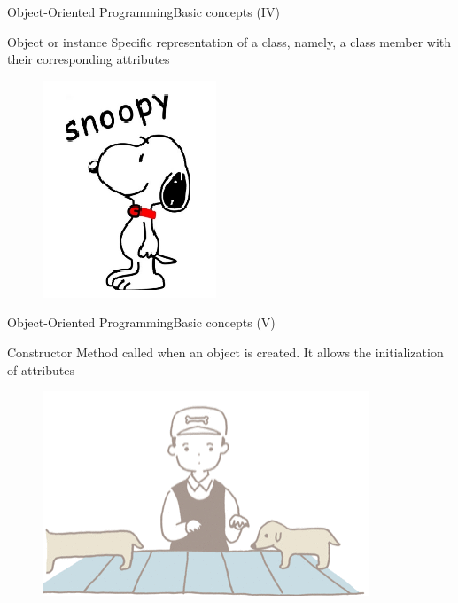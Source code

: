 \documentclass[10pt,compress]{beamer} %
\begin{document}
\begin{frame}{Object-Oriented Programming}{Basic concepts (IV)}
	\vfill\begin{block}{Object or instance}
		 Specific representation of a class, namely, a class member with their corresponding attributes
  	\end{block}	  	
		\begin{figure}
			\includegraphics[scale=0.5]{figs/instancia}
		\end{figure}				
\end{frame}

\begin{frame}{Object-Oriented Programming}{Basic concepts (V)}
	\begin{block}{Constructor}
		 Method called when an object is created. It allows the initialization of attributes
  	\end{block}	
		\begin{figure}
			\includegraphics[scale=0.5]{figs/constructor}
		\end{figure}				
\end{frame}
\end{document}
